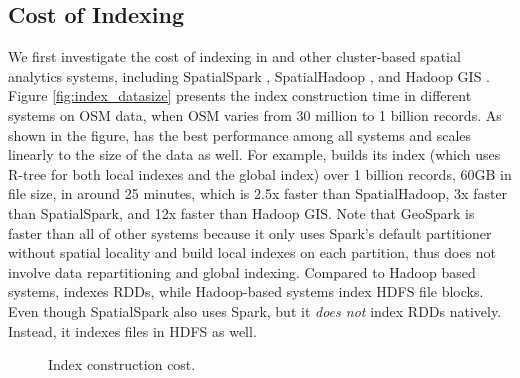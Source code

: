 \subsection{Cost of Indexing}
\label{sec:indexexp}
We first investigate the cost of indexing in \name and other
cluster-based spatial analytics systems, including SpatialSpark
\cite{spatialspark}, SpatialHadoop \cite{spatialhadoop}, and Hadoop
GIS \cite{hadoopgis}. Figure \ref{fig:index_datasize} presents the
index construction time in different systems on OSM data, when OSM
varies from 30 million to 1 billion records. As shown in the figure,
\name has the best performance among all systems and scales linearly
to the size of the data as well. For example, \name builds its index
(which uses R-tree for both local indexes and the global index) over
1 billion records, 60GB in file size, in around 25 minutes, which is
2.5x faster than SpatialHadoop, 3x faster than SpatialSpark, and 12x
faster than Hadoop GIS. Note that GeoSpark is faster than all of
other systems because it only uses Spark's default partitioner
without spatial locality and build local indexes on each partition,
thus does not involve data repartitioning and global indexing. Compared
to Hadoop based systems, \name indexes RDDs, while Hadoop-based systems
index HDFS file blocks. Even though SpatialSpark also uses Spark, but
it {\em does not} index RDDs natively. Instead, it indexes files in HDFS
as well.




\begin{figure}[t]
	\centering
	\caption{Index construction cost.}\vspace{-4mm}
	\label{fig:indexexp}
\end{figure}

